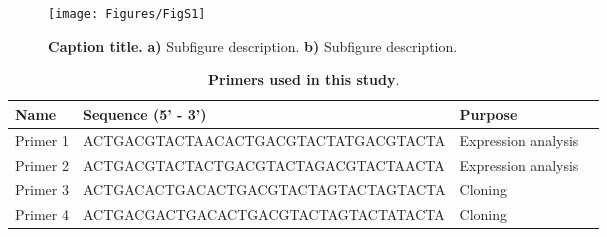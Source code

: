 \documentclass[onecolumn, 11pt,openany]{memoir}
\begin{document}
\begin{figure*}[h]
\centering
\texttt{[image: Figures/FigS1]}
\caption{\textbf{Caption title.} \textbf{a)} Subfigure description. \textbf{b)} Subfigure description.}
\label{figS1_detection}
\end{figure*}

\begin{table*}[h]
\centering
\begin{footnotesize}
\caption{\textbf{Primers used in this study}.}
\label{tabS1_primers}
\begin{tabular}{llll}
\hline
\textbf{Name}                     & \textbf{Sequence (5' - 3')}                           & \textbf{Purpose}                                   &  \\ \hline
Primer 1                  & ACTGACGTACTAACACTGACGTACTATGACGTACTA                          & Expression analysis          &  \\
Primer 2                  & ACTGACGTACTACTGACGTACTAGACGTACTAACTA                  & Expression analysis         &  \\
Primer 3         & ACTGACACTGACACTGACGTACTAGTACTAGTACTA    & Cloning                   &  \\
Primer 4     & ACTGACGACTGACACTGACGTACTAGTACTATACTA     & Cloning                          &  \\ \hline
\end{tabular}
\end{footnotesize}
\end{table*}
\end{document}
